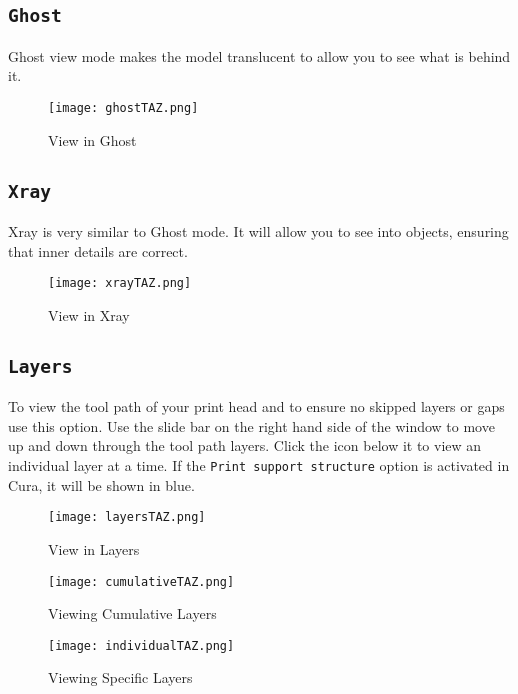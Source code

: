 \subsection{\texttt{Ghost}}
Ghost view mode makes the model translucent to allow you to see what is behind it.
\begin{figure}[H]
\centering
\texttt{[image: ghostTAZ.png]}
\caption{View in Ghost}
\label{fig:Ghost View}
\end{figure}

\subsection{\texttt{Xray}}
Xray is very similar to Ghost mode. It will allow you to see into objects, ensuring that inner details are correct.
\begin{figure}[H]
\centering
\texttt{[image: xrayTAZ.png]}
\caption{View in Xray}
\label{fig:Xray View}
\end{figure}

\subsection{\texttt{Layers}}
To view the tool path of your print head and to ensure no skipped layers or gaps use this option. Use the slide bar on the right hand side of the window to move up and down through the tool path layers. Click the icon below it to view an individual layer at a time. If the \texttt{Print support structure} option is activated in Cura, it will be shown in blue.
\begin{figure}[H]
\centering
\texttt{[image: layersTAZ.png]}
\caption{View in Layers}
\label{fig:Layers View}
\end{figure}

\begin{figure}[H]
\centering
\texttt{[image: cumulativeTAZ.png]}
\caption{Viewing Cumulative Layers}
\label{fig:Mid Layers View}
\end{figure}

\begin{figure}[H]
\centering
\texttt{[image: individualTAZ.png]}
\caption{Viewing Specific Layers}
\label{fig:Viewing Specific Layer}
\end{figure}


